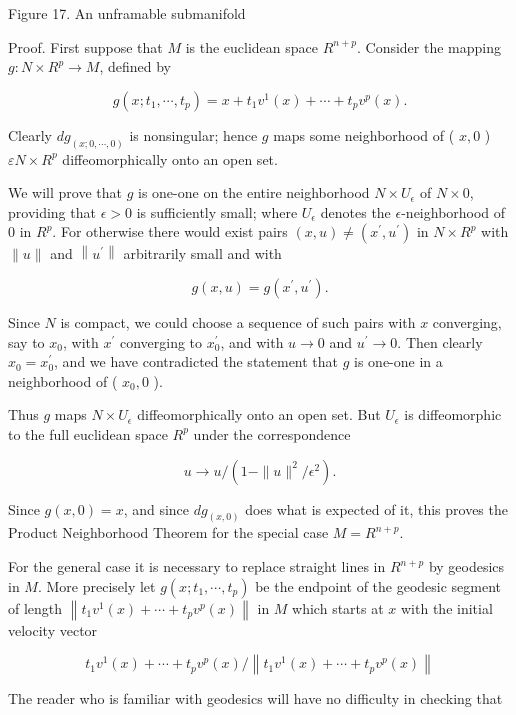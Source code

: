 \documentclass[10pt, letterpaper]{article}
\begin{document}
Figure 17. An unframable submanifold

Proof. First suppose that $M$ is the euclidean space $R^{n+p}$. Consider the mapping $g: N \times R^{p} \rightarrow M$, defined by

$$
g\left(x ; t_{1}, \cdots, t_{p}\right)=x+t_{1} v^{1}(x)+\cdots+t_{p} v^{p}(x) .
$$

Clearly $d g_{(x ; 0, \cdots, 0)}$ is nonsingular; hence $g$ maps some neighborhood of ( $x, 0$ ) $\varepsilon N \times R^{p}$ diffeomorphically onto an open set.

We will prove that $g$ is one-one on the entire neighborhood $N \times U_{\epsilon}$ of $N \times 0$, providing that $\epsilon>0$ is sufficiently small; where $U_{\epsilon}$ denotes the $\epsilon$-neighborhood of 0 in $R^{p}$. For otherwise there would exist pairs $(x, u) \neq\left(x^{\prime}, u^{\prime}\right)$ in $N \times R^{p}$ with $\|u\|$ and $\left\|u^{\prime}\right\|$ arbitrarily small and with

$$
g(x, u)=g\left(x^{\prime}, u^{\prime}\right) .
$$

Since $N$ is compact, we could choose a sequence of such pairs with $x$ converging, say to $x_{0}$, with $x^{\prime}$ converging to $x_{0}^{\prime}$, and with $u \rightarrow 0$ and $u^{\prime} \rightarrow 0$. Then clearly $x_{0}=x_{0}^{\prime}$, and we have contradicted the statement that $g$ is one-one in a neighborhood of ( $x_{0}, 0$ ).

Thus $g$ maps $N \times U_{\epsilon}$ diffeomorphically onto an open set. But $U_{\epsilon}$ is diffeomorphic to the full euclidean space $R^{p}$ under the correspondence

$$
u \rightarrow u /\left(1-\|u\|^{2} / \epsilon^{2}\right) .
$$

Since $g(x, 0)=x$, and since $d g_{(x, 0)}$ does what is expected of it, this proves the Product Neighborhood Theorem for the special case $M=R^{n+p}$.

For the general case it is necessary to replace straight lines in $R^{n+p}$ by geodesics in $M$. More precisely let $g\left(x ; t_{1}, \cdots, t_{p}\right)$ be the endpoint of the geodesic segment of length $\left\|t_{1} v^{1}(x)+\cdots+t_{p} v^{p}(x)\right\|$ in $M$ which starts at $x$ with the initial velocity vector

$$
t_{1} v^{1}(x)+\cdots+t_{p} v^{p}(x) /\left\|t_{1} v^{1}(x)+\cdots+t_{p} v^{p}(x)\right\|
$$

The reader who is familiar with geodesics will have no difficulty in checking that
\end{document}
